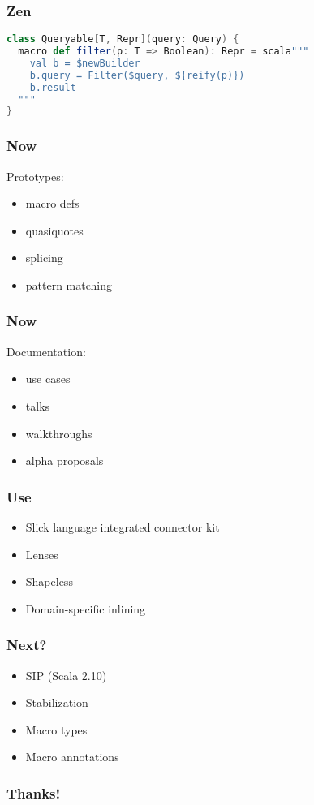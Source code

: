 \documentclass[hyperref={bookmarks=false}]{beamer}
\begin{document}
\begin{frame}[fragile]
\frametitle{Zen}

\begin{lstlisting}[language=scala]
class Queryable[T, Repr](query: Query) {
  macro def filter(p: T => Boolean): Repr = scala"""
    val b = $newBuilder
    b.query = Filter($query, ${reify(p)})
    b.result
  """
}
\end{lstlisting}
\end{frame}

\begin{frame}[fragile]
\frametitle{Now}

Prototypes: 
\begin{itemize}
\item macro defs
\item quasiquotes
\item splicing
\item pattern matching
\end{itemize}
\end{frame}

\begin{frame}[fragile]
\frametitle{Now}

Documentation: 
\begin{itemize}
\item use cases
\item talks
\item walkthroughs
\item alpha proposals
\end{itemize}
\end{frame}

\begin{frame}[fragile]
\frametitle{Use}

\begin{itemize}
\item Slick language integrated connector kit
\item Lenses
\item Shapeless
\item Domain-specific inlining
\end{itemize}
\end{frame}

\begin{frame}[fragile]
\frametitle{Next?}

\begin{itemize}
\item SIP (Scala 2.10)
\item Stabilization
\item Macro types
\item Macro annotations
\end{itemize}
\end{frame}

\begin{frame}[fragile]
\frametitle{Thanks!}

\centering
{}

\end{frame}
\end{document}
